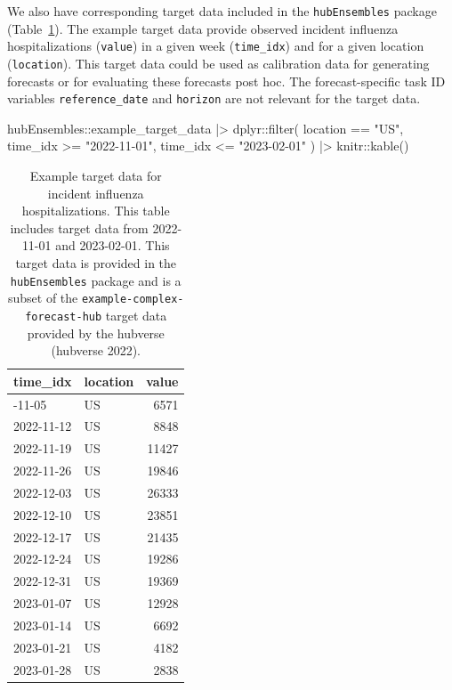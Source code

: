 \documentclass[
]{article}
\newenvironment{Shaded}{\begin{snugshade}}{\end{snugshade}}
\newcommand{\FunctionTok}[1]{\textcolor[rgb]{0.28,0.35,0.67}{#1}}
\newcommand{\NormalTok}[1]{\textcolor[rgb]{0.00,0.23,0.31}{#1}}
\newcommand{\SpecialCharTok}[1]{\textcolor[rgb]{0.37,0.37,0.37}{#1}}
\newcommand{\StringTok}[1]{\textcolor[rgb]{0.13,0.47,0.30}{#1}}
\begin{document}
We also have corresponding target data included in the
\texttt{hubEnsembles} package (Table~\ref{tbl-example-target-data}). The
example target data provide observed incident influenza hospitalizations
(\texttt{value}) in a given week (\texttt{time\_idx}) and for a given
location (\texttt{location}). This target data could be used as
calibration data for generating forecasts or for evaluating these
forecasts post hoc. The forecast-specific task ID variables
\texttt{reference\_date} and \texttt{horizon} are not relevant for the
target data.

\begin{Shaded}
\begin{Highlighting}[]
\NormalTok{hubEnsembles}\SpecialCharTok{::}\NormalTok{example\_target\_data }\SpecialCharTok{|\textgreater{}}
\NormalTok{  dplyr}\SpecialCharTok{::}\FunctionTok{filter}\NormalTok{(}
\NormalTok{    location }\SpecialCharTok{==} \StringTok{"US"}\NormalTok{,}
\NormalTok{    time\_idx }\SpecialCharTok{\textgreater{}=} \StringTok{"2022{-}11{-}01"}\NormalTok{,}
\NormalTok{    time\_idx }\SpecialCharTok{\textless{}=} \StringTok{"2023{-}02{-}01"}
\NormalTok{  ) }\SpecialCharTok{|\textgreater{}}
\NormalTok{  knitr}\SpecialCharTok{::}\FunctionTok{kable}\NormalTok{()}
\end{Highlighting}
\end{Shaded}

\begin{longtable}[]{@{}llr@{}}

\caption{\label{tbl-example-target-data}Example target data for incident
influenza hospitalizations. This table includes target data from
2022-11-01 and 2023-02-01. This target data is provided in the
\texttt{hubEnsembles} package and is a subset of the
\texttt{example-complex-forecast-hub} target data provided by the
hubverse (hubverse 2022).}

\tabularnewline

\toprule\noalign{}
time\_idx & location & value \\
\midrule\noalign{}
\endhead
\bottomrule\noalign{}
\endlastfoot
2022-11-05 & US & 6571 \\
2022-11-12 & US & 8848 \\
2022-11-19 & US & 11427 \\
2022-11-26 & US & 19846 \\
2022-12-03 & US & 26333 \\
2022-12-10 & US & 23851 \\
2022-12-17 & US & 21435 \\
2022-12-24 & US & 19286 \\
2022-12-31 & US & 19369 \\
2023-01-07 & US & 12928 \\
2023-01-14 & US & 6692 \\
2023-01-21 & US & 4182 \\
2023-01-28 & US & 2838 \\

\end{longtable}
\end{document}

